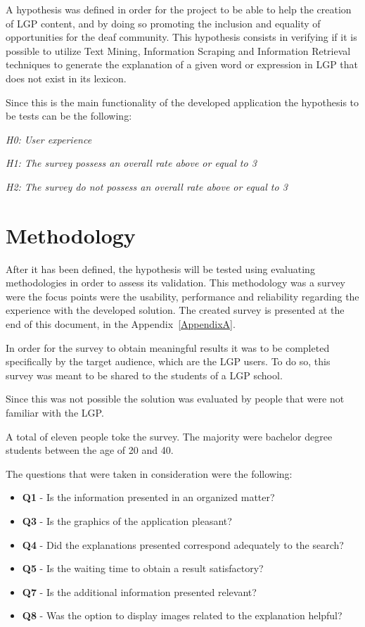 A hypothesis was defined in order for the project to be able to help the creation of \gls{LGP} content, and by doing so promoting the inclusion and equality of opportunities for the deaf community.
This hypothesis consists in verifying if it is possible to utilize Text Mining\cite{gupta2009survey}, Information Scraping\cite{young2006method}\cite{rose2017automatically} and Information Retrieval\cite{baeza1999modern} techniques to generate the explanation of a given word or expression in \gls{LGP} that does not exist in its lexicon.

Since this is the main functionality of the developed application the hypothesis to be tests can be the following:
\begin{center}
    \emph{H0: User experience}

    \emph{H1: The survey possess an overall rate above or equal to 3}

    \emph{H2: The survey do not possess an overall rate above or equal to 3}
\end{center}

\section{Methodology}

After it has been defined, the hypothesis will be tested using evaluating methodologies in order to assess its validation.
This methodology was a survey were the focus points were the usability, performance and reliability regarding the experience with the developed solution.
The created survey is presented at the end of this document, in the Appendix~\ref{AppendixA}.

In order for the survey to obtain meaningful results it was to be completed specifically by the target audience, which are the \gls{LGP} users.
To do so, this survey was meant to be shared to the students of a \gls{LGP} school.

Since this was not possible the solution was evaluated by people that were not familiar with the \gls{LGP}.

A total of eleven people toke the survey.
The majority were bachelor degree students between the age of 20 and 40.

The questions that were taken in consideration were the following:
\begin{itemize}
    \item \textbf{Q1} - Is the information presented in an organized matter?
    \item \textbf{Q3} - Is the graphics of the application pleasant?
    \item \textbf{Q4} - Did the explanations presented correspond adequately to the search?
    \item \textbf{Q5} - Is the waiting time to obtain a result satisfactory?
    \item \textbf{Q7} - Is the additional information presented relevant?
    \item \textbf{Q8} - Was the option to display images related to the explanation helpful?
\end{itemize}

